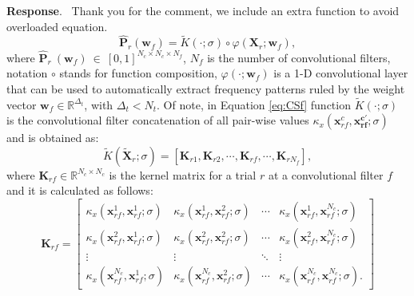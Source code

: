 \documentclass[runningheads]{llncs}
\newcommand{\Real}{\mathbb{R}}
\newcommand{\ve}[1]{\bm {#1}}
\newcommand{\mat}[1]{\bm {#1}}
\newenvironment{reviewer}{\setcounter{pointcounter}{1}}{}
\newcommand{\changes}[1]{\textcolor[rgb]{1.00,0.00,0.00}{#1}}
\newcommand{\reply}{\medskip \noindent \textbf{Response}.\ }
\begin{document}
\begin{reviewer}
    \reply{
      Thank you for the comment, we include an extra function to
      avoid overloaded equation.
      \changes{
        \begin{equation}\label{eq:CSf}
          \hat{\mat{P}}_{r}(\ve{w}_f)  = \tilde{K}(\cdot;\sigma)
          \circ \varphi(\mat{X}_r; \ve{w}_f),
        \end{equation}
        where $\hat{\mat{P}}_{r}~(\ve{w}_f)~\in~[0,1]^{N_c\times N_c
        \times N_f}$, $N_f$ is the number of convolutional filters,
        notation $\circ$ stands for function composition,
        $\varphi(\cdot; \mat{w}_f)$ is a 1-D convolutional layer that
        can be used to automatically extract frequency patterns ruled
        by the weight vector $\ve{w}_f\in \Real^{\Delta_t}$, with
        $\Delta_t<N_t.$ Of note, in Equation \eqref{eq:CSf} function
        $\tilde{K}(\cdot;\sigma)$ is the convolutional filter
        concatenation of all pair-wise values
        $\kappa_{x}(\ve{x}^{c}_{rf},\ve{x^{c'}_{rf}}; \sigma)$ and is
        obtained as:
        \begin{equation}
          \tilde{K}(\mat{\tilde{X}}_r;\sigma) = \left[ \mat{K}_{r1} ,
          \mat{K}_{r2}, \cdots,\mat{K}_{rf},\cdots, \mat{K}_{rN_f} \right],
        \end{equation}
        where $\mat{K}_{rf} \in \Real^{N_c \times N_c}$ is the kernel
        matrix for a trial $r$ at a convolutional filter $f$ and it
        is calculated as follows:
        \begin{equation}
          \mat{K}_{rf} =
          \begin{bmatrix}
            \kappa_{x}(\ve{x}^{1}_{rf}, \ve{x}^{1}_{rf}; \sigma) &
            \kappa_{x}(\ve{x}^{1}_{rf}, \ve{x}^{2}_{rf}; \sigma) &
            \cdots & \kappa_{x}(\ve{x}^{1}_{rf}, \ve{x}^{N_c}_{rf}; \sigma) \\
            \kappa_{x}(\ve{x}^{2}_{rf}, \ve{x}^{1}_{rf}; \sigma) &
            \kappa_{x}(\ve{x}^{2}_{rf}, \ve{x}^{2}_{rf}; \sigma) &
            \cdots & \kappa_{x}(\ve{x}^{2}_{rf}, \ve{x}^{N_c}_{rf}; \sigma) \\
            \vdots & \vdots & \ddots & \vdots \\
            \kappa_{x}(\ve{x}^{N_c}_{rf}, \ve{x}^{1}_{rf}; \sigma) &
            \kappa_{x}(\ve{x}^{N_c}_{rf}, \ve{x}^{2}_{rf}; \sigma) &
            \cdots & \kappa_{x}(\ve{x}^{N_c}_{rf}, \ve{x}^{N_c}_{rf}; \sigma).
          \end{bmatrix}
        \end{equation}
      }
    }


\end{reviewer}
\end{document}
